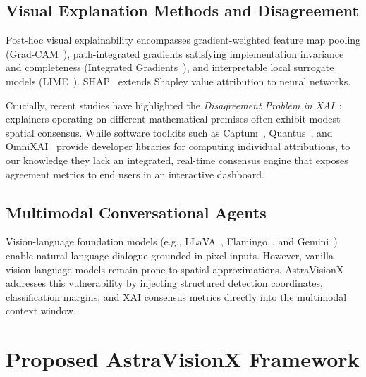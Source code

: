 \documentclass[journal,10pt,twocolumn]{IEEEtran}
\begin{document}
\subsection{Visual Explanation Methods and Disagreement}
Post-hoc visual explainability encompasses gradient-weighted feature map pooling (Grad-CAM~\cite{selvaraju2017gradcam}), path-integrated gradients satisfying implementation invariance and completeness (Integrated Gradients~\cite{sundararajan2017axiomatic}), and interpretable local surrogate models (LIME~\cite{ribeiro2016why}). SHAP~\cite{lundberg2017unified} extends Shapley value attribution to neural networks. 

Crucially, recent studies have highlighted the \textit{Disagreement Problem in XAI}~\cite{krishna2022disagreement}: explainers operating on different mathematical premises often exhibit modest spatial consensus. While software toolkits such as Captum~\cite{kokhlikyan2020captum}, Quantus~\cite{hedstrom2023quantus}, and OmniXAI~\cite{yang2022omnixai} provide developer libraries for computing individual attributions, to our knowledge they lack an integrated, real-time consensus engine that exposes agreement metrics to end users in an interactive dashboard.

\subsection{Multimodal Conversational Agents}
Vision-language foundation models (e.g., LLaVA~\cite{liu2023visual}, Flamingo~\cite{alayrac2022flamingo}, and Gemini~\cite{geminiteam2024gemini}) enable natural language dialogue grounded in pixel inputs. However, vanilla vision-language models remain prone to spatial approximations. AstraVisionX addresses this vulnerability by injecting structured detection coordinates, classification margins, and XAI consensus metrics directly into the multimodal context window.

\section{Proposed AstraVisionX Framework}
\end{document}
